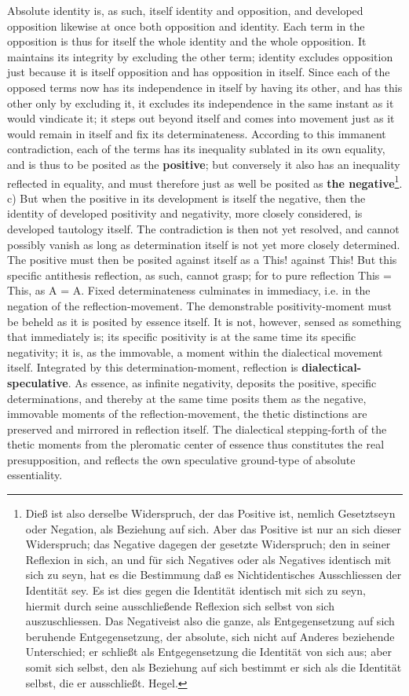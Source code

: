 \documentclass[12pt,a4paper,openany]{book}
\newcommand{\opage}[1]{\marginnote{\footnotesize\textit{[#1]}}}
\begin{document}
Absolute identity is, as such, itself identity and opposition, and developed opposition likewise at once both opposition and identity. Each term in the opposition is thus for itself the whole identity and the whole opposition. It maintains its integrity by excluding the other term; identity excludes opposition just because it is itself opposition and has opposition in itself. Since each of the opposed terms now has its independence in itself by having its other, and has this other only by excluding it, it excludes its independence in the same instant as it would vindicate it; it steps out beyond itself and comes into movement just as it would remain in itself and fix its determinateness. According to this immanent contradiction, each of the terms has its inequality sublated in its own equality, and is thus to be posited as the \textbf{positive}; but conversely it also has an inequality reflected in equality, and must therefore just as well be posited as \textbf{the negative}\footnote{Dieß ist also derselbe Widerspruch, der das Positive ist, nemlich Gesetztseyn oder Negation, als Beziehung auf sich. Aber das Positive ist nur an sich dieser Widerspruch; das Negative dagegen der gesetzte Widerspruch; den in seiner Reflexion in sich, an und für sich Negatives oder als Negatives identisch mit sich zu seyn, hat es die Bestimmung daß es Nichtidentisches Ausschliessen der Identität sey. Es ist dies gegen die Identität identisch mit sich zu seyn, hiermit durch seine ausschließende Reflexion sich selbst von sich auszuschliessen. Das Negativeist also die ganze, als Entgegensetzung auf sich beruhende Entgegensetzung, der absolute, sich nicht auf Anderes beziehende Unterschied; er schließt als Entgegensetzung die Identität von sich aus; aber somit sich selbst, den als Beziehung auf sich bestimmt er sich als die Identität selbst, die er ausschließt. Hegel.}.
\setcounter{footnote}{0}%
\opage{112}c) But when the positive in its development is itself the negative, then the identity of developed positivity and negativity, more closely considered, is developed tautology itself. The contradiction is then not yet resolved, and cannot possibly vanish as long as determination itself is not yet more closely determined. The positive must then be posited against itself as a This! against This! But this specific antithesis reflection, as such, cannot grasp; for to pure reflection This = This, as A = A. Fixed determinateness culminates in immediacy, i.e. in the negation of the reflection-movement. The demonstrable positivity-moment must be beheld as it is posited by essence itself. It is not, however, sensed as something that immediately is; its specific positivity is at the same time its specific negativity; it is, as the immovable, a moment within the dialectical movement itself. Integrated by this determination-moment, reflection is \textbf{dialectical-speculative}. As essence, as infinite negativity, deposits the positive, specific determinations, and thereby at the same time posits them as the negative, immovable moments of the reflection-movement, the thetic distinctions are preserved and mirrored in reflection itself. The dialectical stepping-forth of the thetic moments from the pleromatic center of essence thus constitutes the real presupposition, and reflects the own speculative ground-type of absolute essentiality.
\end{document}
